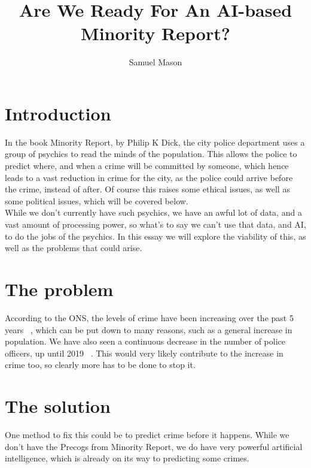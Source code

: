 \documentclass[12pt]{amsart}
\title{Are We Ready For An AI-based Minority Report?}
\author{Samuel Mason}
\begin{document}
    \maketitle
    \tableofcontents


    \section{Introduction}\label{sec:introduction}  %

    In the book Minority Report, by Philip K Dick, the city police department uses a group of psychics to read
    the minds of the population.
    This allows the police to predict where, and when a crime will be committed by someone, which hence leads to a vast
    reduction in crime for the city, as the police could arrive before the crime, instead of after.
    Of course this raises some ethical issues, as well as some political issues, which will be covered below.
    \\
    While we don't currently have such psychics, we have an awful lot of data, and a vast amount of processing power, so
    what's to say we can't use that data, and AI, to do the jobs of the psychics.
    In this essay we will explore the viability of this, as well as the problems that could arise.

    \section{The problem}\label{sec:the-problem}  %

    According to the ONS, the levels of crime have been increasing over the past 5 years ~\cite{ons-crime}, which can be
    put down to many reasons, such as a general increase in population.
    We have also seen a continuous decrease in the number of police officers, up until 2019 ~\cite{ho-pw}.
    This would very likely contribute to the increase in crime too, so clearly more has to be done to stop it.

    \section{The solution}\label{sec:the-solution}  %

    One method to fix this could be to predict crime before it happens.
    While we don't have the Precogs from Minority Report, we do have very powerful artificial intelligence, which is
    already on its way to predicting some crimes.
    \\
\end{document}

